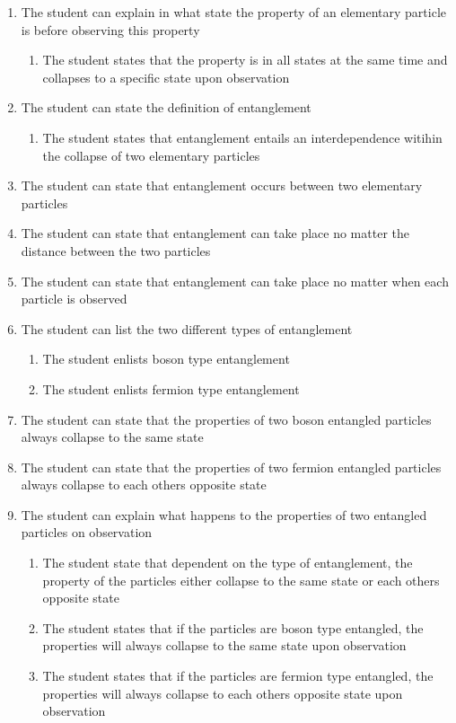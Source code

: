 \documentclass[11pt,twoside]{report} %
\begin{document}
\begin{enumerate}
\item The student can explain in what state the property of an elementary particle is before observing this property
\begin{enumerate}
\item The student states that the property is in all states at the same time and collapses to a specific state upon observation
\end{enumerate}
\item The student can state the definition of entanglement
\begin{enumerate}
\item The student states that entanglement entails an interdependence witihin the collapse of two elementary particles
\end{enumerate}
\item The student can state that entanglement occurs between two elementary particles
\item The student can state that entanglement can take place no matter the distance between the two particles
\item The student can state that entanglement can take place no matter when each particle is observed
\item The student can list the two different types of entanglement
\begin{enumerate}
\item The student enlists boson type entanglement
\item The student enlists fermion type entanglement
\end{enumerate}
\item The student can state that the properties of two boson entangled particles always collapse to the same state
\item The student can state that the properties of two fermion entangled particles always collapse to each others opposite state
\item The student can explain what happens to the properties of two entangled particles on observation
\begin{enumerate}
\item The student state that dependent on the type of entanglement, the property of the particles either collapse to the same state or each others opposite state
\item The student states that if the particles are boson type entangled, the properties will always collapse to the same state upon observation
\item The student states that if the particles are fermion type entangled, the properties will always collapse to each others opposite state upon observation

\end{enumerate}
\end{enumerate}
\end{document}
